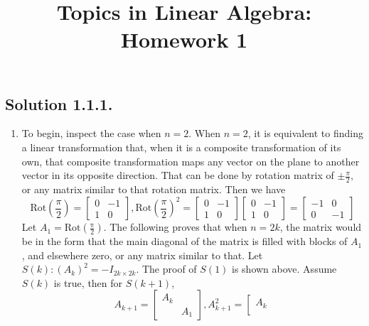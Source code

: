 \documentclass{article}
\title{Topics in Linear Algebra: Homework 1}
\begin{document}
\maketitle
\subsection*{Solution 1.1.1.}
\begin{enumerate}
    \item 
    To begin, inspect the case when $n=2$.\newline
    When $n=2$, it is equivalent to finding a linear transformation that, when it is a composite transformation of its own, that composite transformation maps any vector on the plane to another vector in its opposite direction. That can be done by rotation matrix of $\pm \frac{\pi}{2}$, or any matrix similar to that rotation matrix. Then we have
    \[\mathrm{Rot}\left(\frac{\pi}{2}\right)=\left[\begin{array}{rr}
    0 & -1 \\
    1 &  0
    \end{array}\right],
    \mathrm{Rot}\left(\frac{\pi}{2}\right)^2=\left[\begin{array}{rr}
    0 & -1 \\
    1 &  0
    \end{array}\right]\left[\begin{array}{rr}
    0 & -1 \\
    1 &  0
    \end{array}\right]=\left[\begin{array}{rr}
    -1 & 0 \\
    0 &  -1
    \end{array}\right]\]
    Let $A_1=\mathrm{Rot\left(\frac{\pi}{2}\right)}$. The following proves that when $n=2k$, the matrix would be in the form that the main diagonal of the matrix is filled with blocks of $A_1$, and elsewhere zero, or any matrix similar to that.\newline
    Let $S(k):(A_k)^2=-I_{2k\times 2k}$.\newline
    The proof of $S(1)$ is shown above. \newline
    Assume $S(k)$ is true, then for $S(k+1)$,
    \[A_{k+1}=\left[\begin{array}{rr}
    A_k   \\
    & A_1 
    \end{array}\right], A_{k+1}^2=\left[\begin{array}{rr}
    A_k   \\

\end{array}\]
\end{enumerate}
\end{document}
